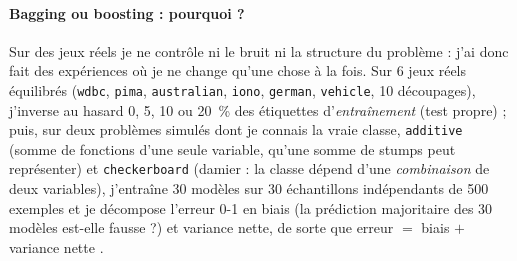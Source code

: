 \documentclass[11pt,a4paper]{article}
\begin{document}
\paragraph{Bagging ou boosting : pourquoi ?}
Sur des jeux réels je ne contrôle ni le bruit ni la structure du problème : j'ai donc fait des expériences où je ne change qu'une chose à la fois. Sur 6 jeux réels équilibrés (\texttt{wdbc}, \texttt{pima}, \texttt{australian}, \texttt{iono}, \texttt{german}, \texttt{vehicle}, 10 découpages), j'inverse au hasard 0, 5, 10 ou 20~\% des étiquettes d'\emph{entraînement}
(test propre) ; puis, sur deux problèmes simulés dont je connais la vraie classe, \texttt{additive} (somme de fonctions d'une seule variable, qu'une somme de stumps peut représenter) et \texttt{checkerboard} (damier : la classe dépend d'une \emph{combinaison} de deux variables), j'entraîne 30 modèles sur 30 échantillons indépendants de 500 exemples
et je décompose l'erreur 0-1 en biais (la prédiction majoritaire des 30 modèles est-elle fausse ?) et variance nette, de sorte que erreur $=$ biais $+$ variance nette \cite{domingos}.
\end{document}
